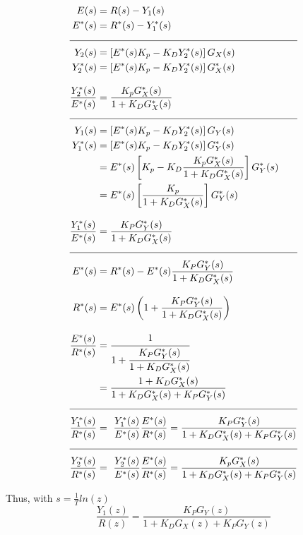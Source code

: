 \documentclass[a4paper,12pt]{article}
\begin{document}
\begin{enumerate}
\begin{enumerate}
 		\begin{equation*}
			\begin{split}		
				 E(s) &= R(s) - Y_1(s)  \\
				 E^*(s) &= R^*(s) - Y_1^*(s) 
				 \\[0.3cm]  \hline \\[-0.3cm]		 
				 Y_2(s) &= \left[ E^*(s) K_p - K_D Y_2^*(s)\right]G_X(s)  \\
				 Y^*_2(s) &= \left[ E^*(s) K_p - K_D Y_2^*(s)\right]G_X^*(s)  \\[0.3cm]
				 \frac{Y_2^*(s)}{E^*(s)}&=\frac{K_p G_X^*(s)}{1+K_D G_X^*(s)}  
				 \\[0.3cm]  \hline \\[-0.3cm]
				 Y_1(s) &= \left[ E^*(s) K_p - K_D Y_2^*(s)\right]G_Y(s)  \\
				 Y^*_1(s) &= \left[ E^*(s) K_p - K_D Y_2^*(s)\right]G_Y^*(s)  \\	
				  &= E^*(s)\left[ K_p - K_D \frac{K_p G_X^*(s)}{1+K_D G_X^*(s)} \right] G_Y^*(s) \\
				  &= E^*(s)\left[  \frac{K_p}{1+K_D G_X^*(s)} \right] G_Y^*(s) \\[0.3cm]
				 \frac{Y_1^*(s)}{E^*(s)}&= \frac{K_P G_Y^*(s)}{1+K_D G_X^*(s)}
				 	\\[0.3cm]  \hline \\[-0.3cm]		 
				 E^*(s) &= R^*(s) - E^*(s) \frac{K_P G_Y^*(s)}{1+K_D G_X^*(s)} \\[0.3cm]
				 R^*(s) &= E^*(s) \left( 1+ \frac{K_P G_Y^*(s)}{1+K_D G_X^*(s)}\right) \\[0.3cm]
				 \frac{E^*(s)}{R^*(s)}&=\cfrac{1}{1+ \cfrac{K_P G_Y^*(s)}{1+K_D G_X^*(s)}} \\	  
				 &= \frac{1+K_D G_X^*(s)}{1+K_D G_X^*(s)+K_P G_Y^*(s)}  \\[0.3cm]  \hline \\[-0.3cm]	
				 \frac{Y_1^*(s)}{R^*(s)} &=  \ \frac{Y_1^*(s)}{E^*(s)} \frac{E^*(s)}{R^*(s)}  = \frac{K_P G_Y^*(s)}{1+K_D G_X^*(s)+K_P G_Y^*(s)}  
				 \\[0.3cm]  \hline \\[-0.3cm]	
				 \frac{Y_2^*(s)}{R^*(s)} &=  \ \frac{Y_2^*(s)}{E^*(s)} \frac{E^*(s)}{R^*(s)}  = \frac{K_p G_X^*(s)}{1+K_D G_X^*(s)+K_P G_Y^*(s)} 
			\end{split}
		\end{equation*}
		

		Thus, with $s=\frac{1}{T}ln(z)$
		$$\boxed{ \frac{Y_1(z)}{R(z)} = \frac{K_P G_Y(z)}{1+K_D G_X(z)+K_P G_Y(z)} }$$
		

\end{enumerate}
\end{enumerate}
\end{document}

